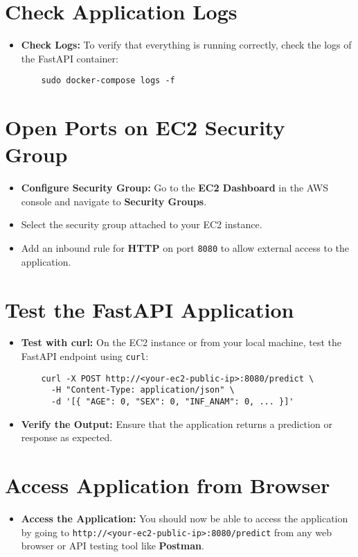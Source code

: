 \documentclass{article}
\begin{document}
\section{Check Application Logs}
\begin{itemize}
    \item \textbf{Check Logs:} To verify that everything is running correctly, check the logs of the FastAPI container:
    \begin{verbatim}
    sudo docker-compose logs -f
    \end{verbatim}
\end{itemize}

\section{Open Ports on EC2 Security Group}
\begin{itemize}
    \item \textbf{Configure Security Group:} Go to the \textbf{EC2 Dashboard} in the AWS console and navigate to \textbf{Security Groups}.
    \item Select the security group attached to your EC2 instance.
    \item Add an inbound rule for \textbf{HTTP} on port \texttt{8080} to allow external access to the application.
\end{itemize}

\section{Test the FastAPI Application}
\begin{itemize}
    \item \textbf{Test with curl:} On the EC2 instance or from your local machine, test the FastAPI endpoint using \texttt{curl}:
    \begin{verbatim}
    curl -X POST http://<your-ec2-public-ip>:8080/predict \
      -H "Content-Type: application/json" \
      -d '[{ "AGE": 0, "SEX": 0, "INF_ANAM": 0, ... }]'
    \end{verbatim}
    \item \textbf{Verify the Output:} Ensure that the application returns a prediction or response as expected.
\end{itemize}

\section{Access Application from Browser}
\begin{itemize}
    \item \textbf{Access the Application:} You should now be able to access the application by going to \texttt{http://<your-ec2-public-ip>:8080/predict} from any web browser or API testing tool like \textbf{Postman}.
\end{itemize}
\end{document}
